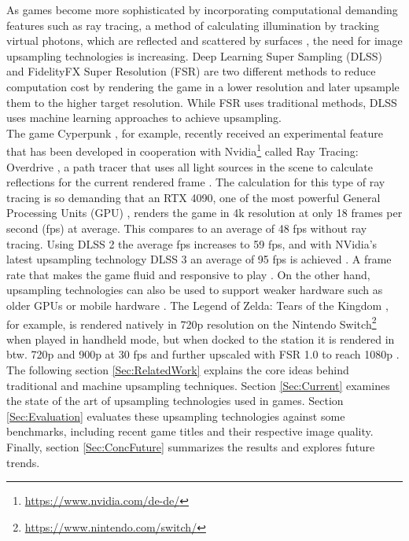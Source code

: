 \documentclass[letterpaper, 10 pt, conference]{ieeeconf}  %
\begin{document}
As games become more sophisticated by incorporating computational demanding features such as ray tracing, a method of calculating illumination by tracking virtual photons, 
which are reflected and scattered by surfaces \cite{ray_tracing}, the need for image upsampling technologies is increasing.
Deep Learning Super Sampling (DLSS) \cite{dlss} and FidelityFX Super Resolution (FSR) \cite{fsr} are two different methods to reduce computation cost 
by rendering the game in a lower resolution and later upsample them to the higher target resolution. 
While FSR uses traditional methods, DLSS uses machine learning approaches to achieve upsampling.\\
The game Cyperpunk \cite{Cyperpunk}, for example, recently received an experimental feature that has been developed in cooperation with Nvidia\footnote{\url{https://www.nvidia.com/de-de/}} 
called Ray Tracing: Overdrive \cite{ray_tracing_overdrive}, a path tracer that uses all light sources in the scene to calculate reflections for the current rendered frame \cite{Shirley2020RTW1}.
The calculation for this type of ray tracing is so demanding that an RTX 4090, 
one of the most powerful General Processing Units (GPU) \cite{4k_gpu_bench}, renders the game in 4k resolution at only 18 frames per second (fps) at average. 
This compares to an average of 48 fps without ray tracing. Using DLSS 2 the average fps increases to 59 fps, and with NVidia's latest upsampling technology DLSS 3 an average of 95 fps is achieved \cite{digital_foundry_ray}. 
A frame rate that makes the game fluid and responsive to play \cite{goodFPS}.
On the other hand, upsampling technologies can also be used to support weaker hardware such as older GPUs or mobile hardware \cite{dong2022rendersr}.
The Legend of Zelda: Tears of the Kingdom \cite{ZeldaTotK}, for example, is rendered natively in 720p resolution on the Nintendo Switch\footnote{\url{https://www.nintendo.com/switch/}} when played in handheld mode, 
but when docked to the station it is rendered in btw. 720p and 900p at 30 fps and further upscaled with FSR 1.0 to reach 1080p \cite{digital_foundry_zelda_fsr}. \\
The following section \ref{Sec:RelatedWork} explains the core ideas behind traditional and machine upsampling techniques.
Section \ref{Sec:Current} examines the state of the art of upsampling technologies used in games.
Section \ref{Sec:Evaluation} evaluates these upsampling technologies against some benchmarks, including recent game titles and their respective image quality.
Finally, section \ref{Sec:ConcFuture} summarizes the results and explores future trends.
\end{document}
